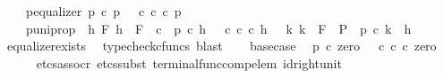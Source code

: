\begin{isabellebody}
\ \ \ \ p{\isacharprime}{\kern0pt}{\isacharunderscore}{\kern0pt}equalizer{\isacharcolon}{\kern0pt}\ {\isachardoublequoteopen}p\ {\isasymcirc}\isactrlsub c\ p{\isacharprime}{\kern0pt}\ {\isacharequal}{\kern0pt}\ {\isacharparenleft}{\kern0pt}{\isasymt}\ {\isasymcirc}\isactrlsub c\ {\isasymbeta}\isactrlbsub {\isasymnat}\isactrlsub c\isactrlesub {\isacharparenright}{\kern0pt}\ {\isasymcirc}\isactrlsub c\ p{\isacharprime}{\kern0pt}{\isachardoublequoteclose}\ \isanewline
\ \ \ \ p{\isacharprime}{\kern0pt}{\isacharunderscore}{\kern0pt}uni{\isacharunderscore}{\kern0pt}prop{\isacharcolon}{\kern0pt}\ {\isachardoublequoteopen}{\isasymforall}\ h\ F{\isachardot}{\kern0pt}\ {\isacharparenleft}{\kern0pt}h\ {\isacharcolon}{\kern0pt}\ F\ {\isasymrightarrow}\ {\isasymnat}\isactrlsub c\ {\isasymand}\ p\ {\isasymcirc}\isactrlsub c\ h\ {\isacharequal}{\kern0pt}\ {\isacharparenleft}{\kern0pt}{\isasymt}\ {\isasymcirc}\isactrlsub c\ {\isasymbeta}\isactrlbsub {\isasymnat}\isactrlsub c\isactrlesub {\isacharparenright}{\kern0pt}\ {\isasymcirc}\isactrlsub c\ h{\isacharparenright}{\kern0pt}\ {\isasymlongrightarrow}\ {\isacharparenleft}{\kern0pt}{\isasymexists}{\isacharbang}{\kern0pt}\ k{\isachardot}{\kern0pt}\ k\ {\isacharcolon}{\kern0pt}\ F\ {\isasymrightarrow}\ P\ {\isasymand}\ p{\isacharprime}{\kern0pt}\ {\isasymcirc}\isactrlsub c\ k\ {\isacharequal}{\kern0pt}\ h{\isacharparenright}{\kern0pt}{\isachardoublequoteclose}\isanewline
\ \ \ \ \isamarkupfalse%
\ equalizer{\isacharunderscore}{\kern0pt}exists{}\ \isamarkupfalse%
\ {\isacharparenleft}{\kern0pt}typecheck{\isacharunderscore}{\kern0pt}cfuncs{\isacharcomma}{\kern0pt}\ blast{\isacharparenright}{\kern0pt}\isanewline
\isanewline
\ \ \isamarkupfalse%
\ base{\isacharunderscore}{\kern0pt}case\ \isamarkupfalse%
\ {\isachardoublequoteopen}p\ {\isasymcirc}\isactrlsub c\ zero\ {\isacharequal}{\kern0pt}\ {\isacharparenleft}{\kern0pt}{\isasymt}\ {\isasymcirc}\isactrlsub c\ {\isasymbeta}\isactrlbsub {\isasymnat}\isactrlsub c\isactrlesub {\isacharparenright}{\kern0pt}\ {\isasymcirc}\isactrlsub c\ zero{\isachardoublequoteclose}\isanewline
\ \ \ \ \isamarkupfalse%
\ {\isacharparenleft}{\kern0pt}etcs{\isacharunderscore}{\kern0pt}assocr{\isacharcomma}{\kern0pt}\ etcs{\isacharunderscore}{\kern0pt}subst\ terminal{\isacharunderscore}{\kern0pt}func{\isacharunderscore}{\kern0pt}comp{\isacharunderscore}{\kern0pt}elem\ id{\isacharunderscore}{\kern0pt}right{\isacharunderscore}{\kern0pt}unit{}{\isacharcomma}{\kern0pt}\ {\isacharminus}{\kern0pt}{\isacharparenright}{\kern0pt}\isanewline

\end{isabellebody}
